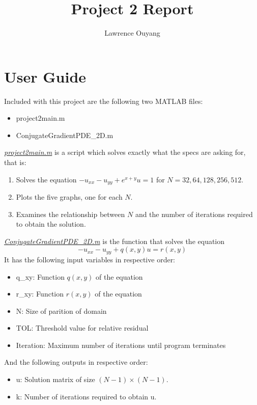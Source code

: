 \documentclass[12pt]{article}
\title{Project 2 Report}
\author{Lawrence Ouyang}
\begin{document}
\maketitle
\section{User Guide}
Included with this project are the following two MATLAB files:
\begin{itemize}
\item project2main.m
\item ConjugateGradientPDE\_2D.m
\end{itemize}
\underline{\textit{project2main.m}} is a script which solves exactly what the specs are asking for, that is:
\begin{enumerate}
\item Solves the equation $-u_{xx} - u_{yy} + e^{x+y}u = 1$ for $ N = {32,64,128,256,512}$.
\item Plots the five graphs, one for each $N$.
\item Examines the relationship between $N$ and the number of iterations required to obtain the solution.
\end{enumerate}
\underline{\textit{ConjugateGradientPDE\_2D.m}} is the function that solves the equation
\[
-u_{xx} - u_{yy} + q(x,y)u = r(x,y)
\]
It has the following input variables in respective order:
\begin{itemize}
\item q\_xy: Function $q(x,y)$ of the equation
\item r\_xy: Function $r(x,y)$ of the equation
\item N: Size of parition of domain
\item TOL: Threshold value for relative residual
\item Iteration: Maximum number of iterations until program terminates
\end{itemize}
And the following outputs in respective order:
\begin{itemize}
\item u: Solution matrix of size $(N-1) \times (N-1)$.
\item k: Number of iterations required to obtain u.
\end{itemize}
\newpage
\end{document}
